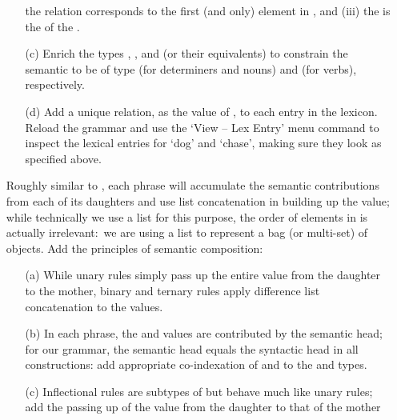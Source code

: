 \documentclass[10pt]{article}
\begin{document}
\begin{enumerate}
\begin{itemize}
                the  relation corresponds to the first (and
                only) element in , and (iii) the 
                is the  of the .
          \item [(c)]
                Enrich the types , , and
                 (or their equivalents) to constrain the
                semantic  to be of type  (for
                determiners and nouns) and  (for verbs),
                respectively.
          \item [(d)]
                Add a unique relation, as the value of
                , to each entry in the lexicon.
                Reload the grammar and use the `View -- Lex Entry' menu
                command to inspect the lexical entries for `dog' and
                `chase', making sure they look as specified above.
        \end{itemize}
  \item []
        Roughly similar to , each phrase will accumulate the
        semantic contributions from each of its daughters and use list
        concatenation in building up the  value; while
        technically we use a list for this purpose, the order of
        elements in  is actually irrelevant:\ we are using a
        list to represent a bag (or multi-set) of objects.
        Add the principles of semantic composition:
        \begin{itemize}
          \item [(a)]
                While unary rules simply pass up the entire 
                value from the daughter to the mother, binary and
                ternary rules apply difference list concatenation to
                the  values.
          \item [(b)]
                In each phrase, the  and  values
                are contributed by the semantic head; for our grammar,
                the semantic head equals the syntactic head in all
                constructions: add appropriate co-indexation of
                 and  to the 
                and  types.
          \item [(c)]
                Inflectional rules are subtypes of  but
                behave much like unary rules; add the passing up of the
                 value from the daughter to that of the mother

\end{itemize}
\end{enumerate}
\end{document}
